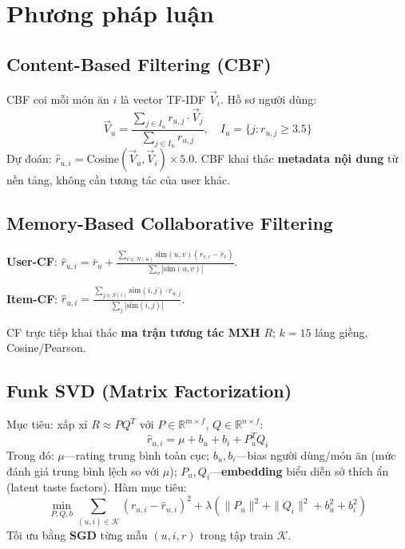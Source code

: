 \documentclass[11pt]{article}
\begin{document}
\section{Phương pháp luận}
\label{sec:method}

\subsection{Content-Based Filtering (CBF)}
CBF coi mỗi món ăn $i$ là vector TF-IDF $\vec{V}_i$. Hồ sơ người dùng:
\begin{equation}
    \vec{V}_u = \frac{\sum_{j \in I_u} r_{u,j} \cdot \vec{V}_j}{\sum_{j \in I_u} r_{u,j}}, \quad I_u = \{j : r_{u,j} \geq 3.5\}
\end{equation}
Dự đoán: $\hat{r}_{u,i} = \text{Cosine}(\vec{V}_u, \vec{V}_i) \times 5.0$. CBF khai thác \textbf{metadata nội dung} từ nền tảng, không cần tương tác của user khác.

\subsection{Memory-Based Collaborative Filtering}
\textbf{User-CF}: $\hat{r}_{u,i} = \bar{r}_u + \frac{\sum_{v \in N(u)} \text{sim}(u,v)(r_{v,i}-\bar{r}_v)}{\sum_{v} |\text{sim}(u,v)|}$.

\textbf{Item-CF}: $\hat{r}_{u,i} = \frac{\sum_{j \in S(i)} \text{sim}(i,j) \cdot r_{u,j}}{\sum_{j} |\text{sim}(i,j)|}$.

CF trực tiếp khai thác \textbf{ma trận tương tác MXH} $R$; $k=15$ láng giềng, Cosine/Pearson.

\subsection{Funk SVD (Matrix Factorization)}
Mục tiêu: xấp xỉ $R \approx P Q^T$ với $P \in \mathbb{R}^{m \times f}$, $Q \in \mathbb{R}^{n \times f}$:
\begin{equation}
    \hat{r}_{u,i} = \mu + b_u + b_i + P_u^T Q_i
\end{equation}
Trong đó: $\mu$---rating trung bình toàn cục; $b_u, b_i$---bias người dùng/món ăn (mức đánh giá trung bình lệch so với $\mu$); $P_u, Q_i$---\textbf{embedding} biểu diễn sở thích ẩn (latent taste factors). Hàm mục tiêu:
\begin{equation}
    \min_{P,Q,b} \sum_{(u,i) \in \mathcal{K}} (r_{u,i} - \hat{r}_{u,i})^2 + \lambda(\|P_u\|^2 + \|Q_i\|^2 + b_u^2 + b_i^2)
\end{equation}
Tối ưu bằng \textbf{SGD} từng mẫu $(u,i,r)$ trong tập train $\mathcal{K}$.
\end{document}
